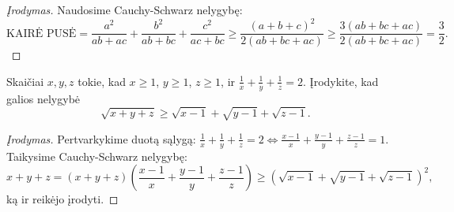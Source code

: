 \begin{proof}[Įrodymas]
  Naudosime Cauchy-Schwarz nelygybę:
  $$\mbox{KAIRĖ
  PUSĖ}=\frac{a^2}{ab+ac}+\frac{b^2}{ab+bc}+\frac{c^2}{ac+bc}\geq\frac{(a+b+c)^2}{2(ab+bc+ac)}\geq\frac{3(ab+bc+ac)}{2(ab+bc+ac)}=\frac{3}{2}.$$
\end{proof}

\begin{pavnr}[Iran 1998]
  Skaičiai $x,y,z$ tokie, kad $x\geq1$, $y\geq1$, $z\geq1$, ir
  $\frac{1}{x}+\frac{1}{y}+\frac{1}{z}=2$. Įrodykite, kad galios nelygybė
  $$\sqrt{x+y+z}\geq\sqrt{x-1}+\sqrt{y-1}+\sqrt{z-1}.$$
\end{pavnr}

\begin{proof}[Įrodymas]
  Pertvarkykime duotą sąlygą: $\frac{1}{x}+\frac{1}{y}+\frac{1}{z}=2
  \Leftrightarrow\frac{x-1}{x}+\frac{y-1}{y}+\frac{z-1}{z}=1$.
  Taikysime Cauchy-Schwarz nelygybę:
  $$x+y+z=(x+y+z)(\frac{x-1}{x}+\frac{y-1}{y}+\frac{z-1}{z})\geq(\sqrt{x-1}+\sqrt{y-1}+\sqrt{z-1})^2,$$
  ką ir reikėjo įrodyti.
\end{proof}

